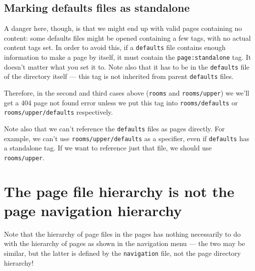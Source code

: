 \subsection{Marking defaults files as standalone}
A danger here, though, is that we might end up with valid pages containing no
content: some defaults files might be opened containing a few tags, with no
actual content tags set. In order to avoid this, if a \texttt{defaults} file
contains enough information to make a page by itself, it must contain the
\texttt{page:standalone} tag. It doesn't matter what you set it to. Note also
that it has to be in the \texttt{defaults} file of the directory itself ---
this tag is not inherited from parent \texttt{defaults} files.

Therefore, in the second and third cases above (\texttt{rooms} and
\texttt{rooms/upper}) we we'll get a 404 page not found error unless we put
this tag into \texttt{rooms/defaults} or \texttt{rooms/upper/defaults}
respectively.

Note also that we can't reference the \texttt{defaults} files as pages
directly. For example, we can't use \texttt{rooms/upper/defaults} as a
specifier, even if \texttt{defaults} has a standalone tag. If we want to
reference just that file, we should use \texttt{rooms/upper}.

\section{The page file hierarchy is not the page navigation hierarchy}
Note that the hierarchy of page files in the pages has nothing necessarily to
do with the hierarchy of pages as shown in the navigation menu --- the two may
be similar, but the latter is defined by the \texttt{navigation} file, not the
page directory hierarchy!

